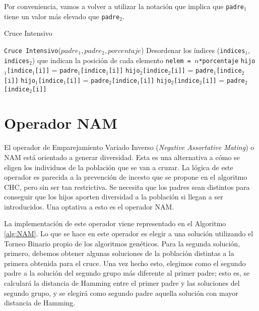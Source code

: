Por conveniencia, vamos a volver a utilizar la notación que implica que \texttt{padre$_1$} tiene un valor más elevado que \texttt{padre$_2$}.

\begin{algorithm}
\caption{Cruce Intensivo}\label{alg:CI}
\begin{algorithmic}[1]
\Procedure \texttt{Cruce Intensivo}($padre_1, padre_2, porcentaje$)
\State Desordenar los índices (\texttt{indices$_1$}, \texttt{indices$_2$}) que indican la posición de cada elemento
\State \texttt{nelem = $n$*porcentaje}
		\State \texttt{hijo$_1$[indice$_1$[i]]} = \texttt{padre$_1$[indice$_1$[i]]}
		\State \texttt{hijo$_2$[indice$_2$[i]]} = \texttt{padre$_1$[indice$_2$[i]]}
	\Else
		\State \texttt{hijo$_1$[indice$_1$[i]]} = \texttt{padre$_2$[indice$_1$[i]]}
		\State \texttt{hijo$_2$[indice$_2$[i]]} = \texttt{padre$_2$[indice$_2$[i]]}
	\EndIf
\EndFor
\EndProcedure
\end{algorithmic}
\end{algorithm}

\section{Operador NAM}

El operador de Emparejamiento Variado Inverso (\textit{Negative Assortative Mating}) o NAM
\parencite{fernandesStudyNonrandomMating2001} está orientado a generar diversidad. 
Esta es una alternativa a cómo se eligen los individuos de la población que se van a cruzar. 
La lógica de este operador es parecida a la prevención de incesto que se propone en el algoritmo CHC, pero sin ser tan restrictiva. 
Se necesita que los padres sean distintos para conseguir que los hijos aporten diversidad a la población si llegan a ser introducidos. 
Una optativa a esto es el operador NAM. 

La implementación de este operador viene representado en el Algoritmo \ref{alg:NAM}. 
Lo que se hace en este operador es elegir a una solución utilizando el Torneo Binario propio de los algoritmos genéticos. 
Para la segunda solución, primero, debemos obtener algunas soluciones de la población distintas a la primera obtenida para el cruce. 
Una vez hecho esto, elegimos como el segundo padre a la solución del segundo grupo más diferente al primer padre; esto es, se calculará la distancia de Hamming entre el primer padre y las soluciones del segundo grupo, y se elegirá como segundo padre aquella solución con mayor distancia de Hamming.

